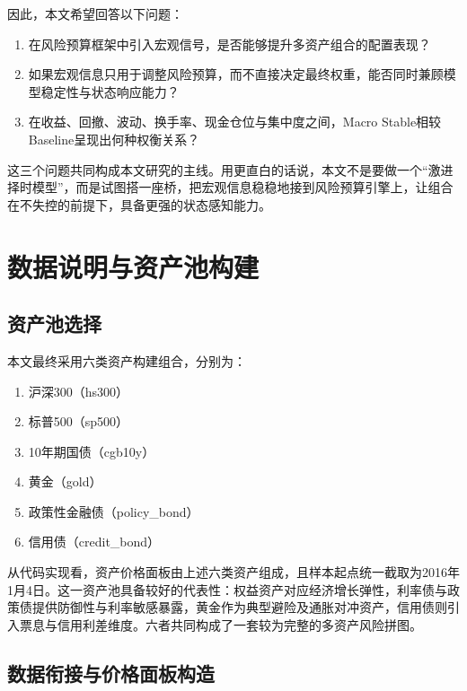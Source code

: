 \documentclass[12pt,a4paper]{ctexart}
\begin{document}
因此，本文希望回答以下问题：

\begin{enumerate}[label=\arabic*)]
    \item 在风险预算框架中引入宏观信号，是否能够提升多资产组合的配置表现？
    \item 如果宏观信息只用于调整风险预算，而不直接决定最终权重，能否同时兼顾模型稳定性与状态响应能力？
    \item 在收益、回撤、波动、换手率、现金仓位与集中度之间，Macro Stable相较Baseline呈现出何种权衡关系？
\end{enumerate}

这三个问题共同构成本文研究的主线。用更直白的话说，本文不是要做一个“激进择时模型”，而是试图搭一座桥，把宏观信息稳稳地接到风险预算引擎上，让组合在不失控的前提下，具备更强的状态感知能力。

\section{数据说明与资产池构建}

\subsection{资产池选择}

本文最终采用六类资产构建组合，分别为：

\begin{enumerate}[label=\arabic*)]
    \item 沪深300（hs300）
    \item 标普500（sp500）
    \item 10年期国债（cgb10y）
    \item 黄金（gold）
    \item 政策性金融债（policy\_bond）
    \item 信用债（credit\_bond）
\end{enumerate}

从代码实现看，资产价格面板由上述六类资产组成，且样本起点统一截取为2016年1月4日。这一资产池具备较好的代表性：权益资产对应经济增长弹性，利率债与政策债提供防御性与利率敏感暴露，黄金作为典型避险及通胀对冲资产，信用债则引入票息与信用利差维度。六者共同构成了一套较为完整的多资产风险拼图。

\subsection{数据衔接与价格面板构造}
\end{document}
